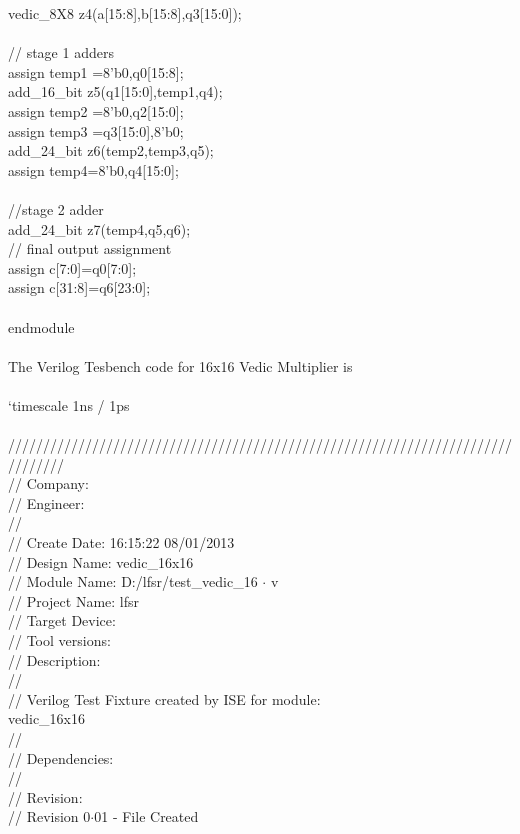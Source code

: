 vedic\_8X8 z4(a[15:8],b[15:8],q3[15:0]);\\
\\
// stage 1 adders \\
assign temp1 ={8'b0,q0[15:8]};\\
add\_16\_bit z5(q1[15:0],temp1,q4);\\
assign temp2 ={8'b0,q2[15:0]};\\
assign temp3 ={q3[15:0],8'b0};\\
add\_24\_bit z6(temp2,temp3,q5);\\
assign temp4={8'b0,q4[15:0]};\\
\\
//stage 2 adder\\
add\_24\_bit z7(temp4,q5,q6);\\
// final output assignment \\
assign c[7:0]=q0[7:0];\\
assign c[31:8]=q6[23:0];\\
\\
endmodule\\
\\
The Verilog Tesbench code for 16x16 Vedic Multiplier is\\
\\
`timescale 1ns / 1ps\\
\\
////////////////////////////////////////////////////////////////////////////////\\
// Company: \\
// Engineer:\\
//\\
// Create Date:   16:15:22 08/01/2013\\
// Design Name:   vedic\_16x16\\
// Module Name:   D:/lfsr/test\_vedic\_16 $ \cdot $ v\\
// Project Name:  lfsr\\
// Target Device:  \\
// Tool versions:  \\
// Description: \\
//\\
// Verilog Test Fixture created by ISE for module:\\ vedic\_16x16\\
//\\
// Dependencies:\\
// \\
// Revision:\\
// Revision 0$ \cdot $01 - File Created\\
